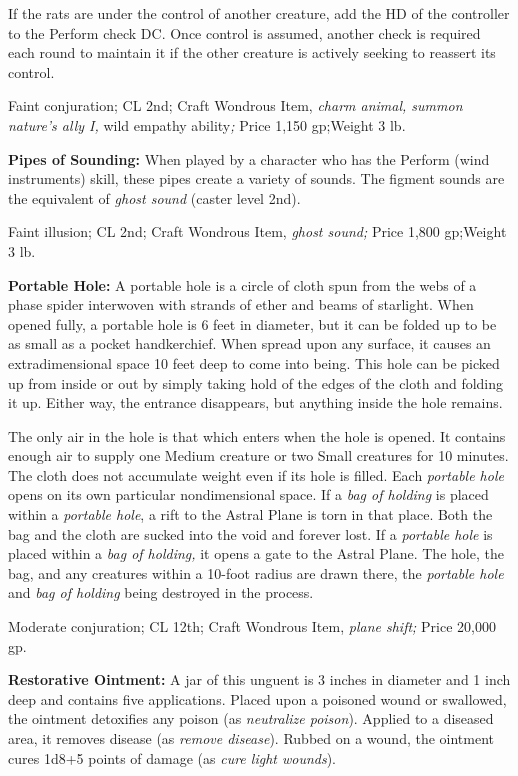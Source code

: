 If the rats are under the control of another creature, add the HD of the controller 
to the Perform check DC. Once control is assumed, another check is required each 
round to maintain it if the other creature is actively seeking to reassert its 
control.

Faint conjuration; CL 2nd; Craft Wondrous Item, \textit{charm animal, summon nature's 
ally I, }wild empathy ability\textit{; }Price 1,150 gp;Weight 3 lb.

\textbf{Pipes of Sounding:} When played by a character who has the Perform (wind 
instruments) skill, these pipes create a variety of sounds. The figment sounds 
are the equivalent of \textit{ghost sound }(caster level 2nd).

Faint illusion; CL 2nd; Craft Wondrous Item, \textit{ghost sound; }Price 1,800 
gp;Weight 3 lb.

\textbf{Portable Hole:} A portable hole is a circle of cloth spun from the webs 
of a phase spider interwoven with strands of ether and beams of starlight. When 
opened fully, a portable hole is 6 feet in diameter, but it can be folded up to 
be as small as a pocket handkerchief. When spread upon any surface, it causes an 
extradimensional space 10 feet deep to come into being. This hole can be picked 
up from inside or out by simply taking hold of the edges of the cloth and folding 
it up. Either way, the entrance disappears, but anything inside the hole remains.

The only air in the hole is that which enters when the hole is opened. It contains 
enough air to supply one Medium creature or two Small creatures for 10 minutes. 
The cloth does not accumulate weight even if its hole is filled. Each \textit{portable 
hole }opens on its own particular nondimensional space. If a \textit{bag of holding 
}is placed within a \textit{portable hole}, a rift to the Astral Plane is torn 
in that place. Both the bag and the cloth are sucked into the void and forever 
lost. If a \textit{portable hole }is placed within a \textit{bag of holding, }it 
opens a gate to the Astral Plane. The hole, the bag, and any creatures within a 
10-foot radius are drawn there, the \textit{portable hole }and \textit{bag of holding 
}being destroyed in the process.

Moderate conjuration; CL 12th; Craft Wondrous Item, \textit{plane shift; }Price 
20,000 gp.

\textbf{Restorative Ointment: }A jar of this unguent is 3 inches in diameter and 
1 inch deep and contains five applications. Placed upon a poisoned wound or swallowed, 
the ointment detoxifies any poison (as \textit{neutralize poison}). Applied to 
a diseased area, it removes disease (as \textit{remove disease}). Rubbed on a wound, 
the ointment cures 1d8+5 points of damage (as \textit{cure light wounds}).

